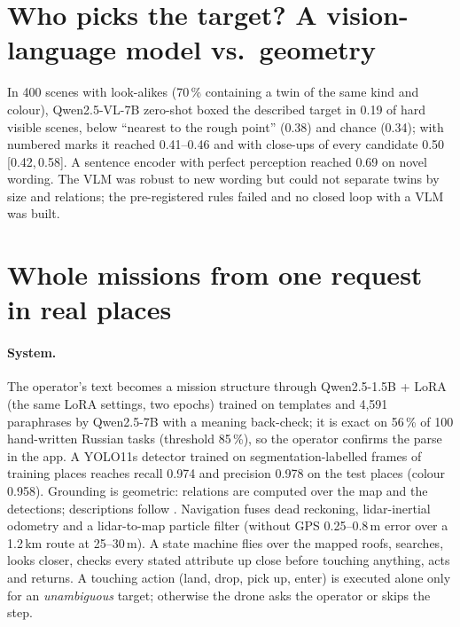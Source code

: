 \documentclass[10pt]{article}
\newcommand{\ci}[2]{\,[#1,\,#2]}
\begin{document}
\section{Who picks the target? A vision-language model vs.\ geometry}\label{sec:vlm}
In 400 scenes with look-alikes (70\,\% containing a twin of the same kind and colour), Qwen2.5-VL-7B \citep{qwen25vl} zero-shot
boxed the described target in 0.19 of hard visible scenes, below ``nearest to the rough point'' (0.38) and chance (0.34); with
numbered marks \citep{yang2023som} it reached 0.41--0.46 and with close-ups of every candidate 0.50\ci{0.42}{0.58}. A sentence encoder with perfect
perception reached 0.69 on novel wording. The VLM was robust to new wording but could not separate twins by size and relations;
the pre-registered rules failed and no closed loop with a VLM was built.

\section{Whole missions from one request in real places}\label{sec:missions}
\paragraph{System.} The operator's text becomes a mission structure through Qwen2.5-1.5B + LoRA (the same LoRA settings, two epochs) trained on templates and 4,591
paraphrases by Qwen2.5-7B with a meaning back-check; it is exact on 56\,\% of 100 hand-written Russian tasks (threshold 85\,\%), so
the operator confirms the parse in the app. A YOLO11s detector \citep{yolo11} trained on segmentation-labelled frames of training
places reaches recall 0.974 and precision 0.978 on the test places (colour 0.958). Grounding is geometric: relations are computed
over the map and the detections; descriptions follow \citet{dale1995}. Navigation fuses dead reckoning, lidar-inertial odometry and a
lidar-to-map particle filter (without GPS 0.25--0.8\,m error over a 1.2\,km route at 25--30\,m). A state machine flies over the
mapped roofs, searches, looks closer, checks every stated attribute up close before touching anything, acts and returns. A
touching action (land, drop, pick up, enter) is executed alone only for an \emph{unambiguous} target; otherwise the drone asks the
operator or skips the step.
\end{document}
